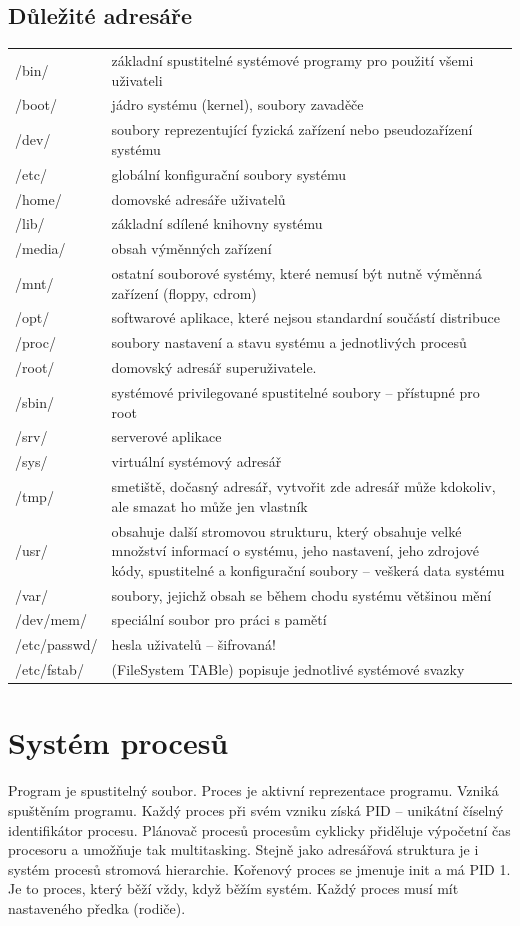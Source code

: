 \documentclass{article}
\begin{document}
\subsection{Důležité adresáře}
\begin{tabular}{l p{11cm}}
/bin/ & základní spustitelné systémové programy pro použití všemi uživateli\\
/boot/ & jádro systému (kernel), soubory zavaděče\\
/dev/ & soubory reprezentující fyzická zařízení nebo pseudozařízení systému\\
/etc/ & globální konfigurační soubory systému\\
/home/ & domovské adresáře uživatelů\\
/lib/ & základní sdílené knihovny systému\\
/media/ & obsah výměnných zařízení\\
/mnt/ & ostatní souborové systémy, které nemusí být nutně výměnná zařízení (floppy, cdrom)\\
/opt/ & softwarové aplikace, které nejsou standardní součástí distribuce\\
/proc/ & soubory nastavení a stavu systému a jednotlivých procesů\\
/root/ & domovský adresář superuživatele.\\
/sbin/ & systémové privilegované spustitelné soubory -- přístupné pro root\\
/srv/ & serverové aplikace\\
/sys/ & virtuální systémový adresář\\
/tmp/ & smetiště, dočasný adresář, vytvořit zde adresář může kdokoliv, ale smazat ho může jen vlastník\\
/usr/ & obsahuje další stromovou strukturu, který obsahuje velké množství informací o systému, jeho nastavení, jeho zdrojové kódy, spustitelné a konfigurační soubory -- veškerá data systému\\
/var/ &  soubory, jejichž obsah se během chodu systému většinou mění\\
/dev/mem/ & speciální soubor pro práci s pamětí\\
/etc/passwd/ & hesla uživatelů -- šifrovaná!\\
/etc/fstab/& (FileSystem TABle) popisuje jednotlivé systémové svazky\\
\end{tabular} 

\section{Systém procesů}
Program je spustitelný soubor. Proces je aktivní reprezentace programu. Vzniká spuštěním programu. Každý proces při svém vzniku získá PID -- unikátní číselný identifikátor procesu. Plánovač procesů procesům cyklicky přiděluje výpočetní čas procesoru a umožňuje tak multitasking. Stejně jako adresářová struktura je i systém procesů stromová hierarchie. Kořenový proces se jmenuje init a má PID 1. Je to proces, který běží vždy, když běžím systém. Každý proces musí mít nastaveného předka (rodiče).
\end{document}
